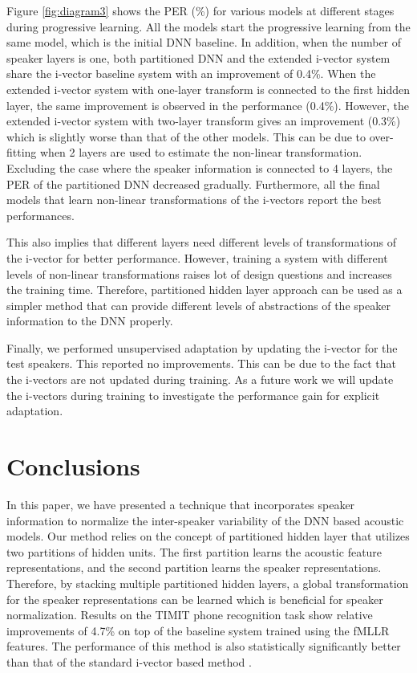 \documentclass[a4paper]{article}
\begin{document}
  Figure \ref{fig:diagram3} shows the PER (\%) for various models at different stages  during progressive learning.  All the models start the progressive learning from the same model, which is the initial DNN baseline. In addition, when the number of speaker layers is one, both partitioned DNN and the extended i-vector system share the i-vector baseline system with an improvement of 0.4\%. When the extended i-vector system with one-layer transform is connected to the first hidden layer, the same improvement is observed in the performance (0.4\%). However,  the extended i-vector system with two-layer transform gives an improvement (0.3\%) which is slightly worse than that of the other models. This can be due to over-fitting when 2 layers are used to estimate the non-linear transformation. Excluding the case where the speaker information is connected to 4 layers, the PER of the partitioned DNN decreased gradually. Furthermore,  all the final models that learn non-linear transformations of the i-vectors report the best performances. 
  
  This also implies that different layers need different levels of transformations of the i-vector for better performance. However, training a system with different levels of non-linear transformations raises lot of design questions and increases the training time. Therefore, partitioned hidden layer approach can be used as a simpler method that can provide different levels of abstractions of the speaker information to the DNN properly. 
  
  Finally, we performed unsupervised adaptation by updating the i-vector for the test speakers. This  reported no improvements. This can be due to the fact that the i-vectors are not updated during training.  As a future work we will update the i-vectors during training to investigate the performance gain for explicit adaptation.  
 
 \section{Conclusions}
 
 In this paper, we have presented a technique that incorporates speaker information to normalize the inter-speaker variability of  the DNN based acoustic models.  Our method relies on the concept of partitioned hidden layer that utilizes two partitions of hidden units. The first partition learns the acoustic feature representations, and the second partition learns the speaker representations. Therefore, by stacking multiple partitioned hidden layers, a global transformation for the speaker representations can be learned which is beneficial for speaker normalization.  Results on the TIMIT phone recognition task show relative improvements of 4.7\% on top of the baseline system trained using the fMLLR features. The performance of this method is also statistically significantly better than that of the standard i-vector based method \cite{IVECT}\cite{IVECT1}\cite{IVECT4}. 
 
  \newpage
  \eightpt
  

  
\end{document}
